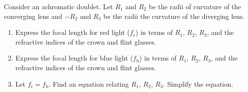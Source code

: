 \documentclass[main.tex]{subfiles}
\begin{document}
\begin{q}{4}
Consider an achromatic doublet. Let $R_1$ and $R_2$ be the radii of curvature of
the converging lens and $-R_2$ and $R_3$ be the radii the curvature of the
diverging lens.
\begin{enumerate}[label=\text{(\alph*)}]
    \item Express the focal length for red light ($f_{\text{r}}$) in terms of
    $R_1$, $R_2$, $R_3$, and the refractive indices of the crown and flint
    glasses.
    \item Express the focal length for blue light ($f_{\text{b}}$) in terms of
    $R_1$, $R_2$, $R_3$, and the refractive indices of the crown and flint
    glasses.
    \item Let $f_{\text{r}} = f_{\text{b}}$. Find an equation relating $R_1$,
    $R_2$, $R_3$. Simplify the equation.
\end{enumerate}
\end{q}
\end{document}
